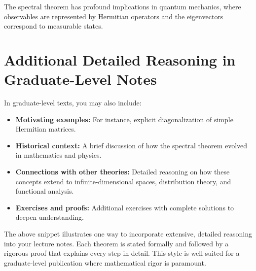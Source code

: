 	\begin{remark}
		The spectral theorem has profound implications in quantum mechanics, where observables are represented by Hermitian operators and the eigenvectors correspond to measurable states.
	\end{remark}
	
	\chapter{Additional Detailed Reasoning in Graduate-Level Notes}
	
	In graduate-level texts, you may also include:
	\begin{itemize}
		\item \textbf{Motivating examples:} For instance, explicit diagonalization of simple Hermitian matrices.
		\item \textbf{Historical context:} A brief discussion of how the spectral theorem evolved in mathematics and physics.
		\item \textbf{Connections with other theories:} Detailed reasoning on how these concepts extend to infinite-dimensional spaces, distribution theory, and functional analysis.
		\item \textbf{Exercises and proofs:} Additional exercises with complete solutions to deepen understanding.
	\end{itemize}
	
	The above snippet illustrates one way to incorporate extensive, detailed reasoning into your lecture notes. Each theorem is stated formally and followed by a rigorous proof that explains every step in detail. This style is well suited for a graduate-level publication where mathematical rigor is paramount.
	
	

